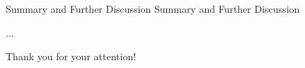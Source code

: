 \documentclass[pdf]{beamer}
\begin{document}
    \begin{frame}{Summary and Further Discussion}
	Summary and Further Discussion
    \end{frame}


\begin{frame}{...}

\begin{center}
\huge{Thank you for your attention!}
\end{center}

\end{frame}
\end{document}
